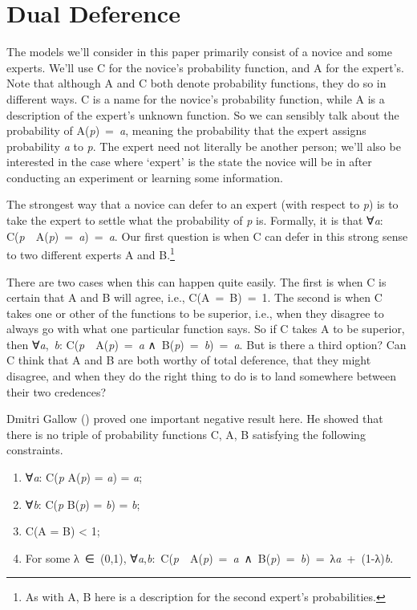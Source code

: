 \documentclass[
  11pt,
  letterpaper,
  DIV=11,
  numbers=noendperiod,
  twoside]{scrartcl}
\providecommand{\tightlist}{%
  \setlength{\itemsep}{0pt}\setlength{\parskip}{0pt}}
\begin{document}
\section{Dual Deference}\label{sec-gallow}

The models we'll consider in this paper primarily consist of a novice
and some experts. We'll use C for the novice's probability function, and
A for the expert's. Note that although A and C both denote probability
functions, they do so in different ways. C is a name for the novice's
probability function, while A is a description of the expert's unknown
function. So we can sensibly talk about the probability of
A(\emph{p})~=~\emph{a}, meaning the probability that the expert assigns
probability \emph{a} to \emph{p}. The expert need not literally be
another person; we'll also be interested in the case where `expert' is
the state the novice will be in after conducting an experiment or
learning some information.

The strongest way that a novice can defer to an expert (with respect to
\emph{p}) is to take the expert to settle what the probability of
\emph{p} is. Formally, it is that ∀\emph{a}:
C(\emph{p}~\textbar~A(\emph{p})~=~\emph{a})~=~\emph{a}. Our first
question is when C can defer in this strong sense to two different
experts A and B.\footnote{As with A, B here is a description for the
  second expert's probabilities.}

There are two cases when this can happen quite easily. The first is when
C is certain that A and B will agree, i.e., C(A~=~B)~=~1. The second is
when C takes one or other of the functions to be superior, i.e., when
they disagree to always go with what one particular function says. So if
C takes A to be superior, then ∀\emph{a},~\emph{b}:
C(\emph{p}~\textbar~A(\emph{p})~=~\emph{a}
∧~B(\emph{p})~=~\emph{b})~=~\emph{a}. But is there a third option? Can C
think that A and B are both worthy of total deference, that they might
disagree, and when they do the right thing to do is to land somewhere
between their two credences?

Dmitri Gallow () proved one important
negative result here. He showed that there is no triple of probability
functions C, A, B satisfying the following constraints.

\begin{enumerate}
\def\labelenumi{\arabic{enumi}.}
\tightlist
\item
  ∀\emph{a}: C(\emph{p} \textbar{} A(\emph{p}) = \emph{a}) = \emph{a};
\item
  ∀\emph{b}: C(\emph{p} \textbar{} B(\emph{p}) = \emph{b}) = \emph{b};
\item
  C(A = B) \textless{} 1;
\item
  For some λ~∈~(0,1),
  ∀\emph{a},\emph{b}:~C(\emph{p}~\textbar~A(\emph{p})~=~\emph{a}~∧~B(\emph{p})~=~\emph{b})~=~λ\emph{a}~+~(1-λ)\emph{b}.
\end{enumerate}
\end{document}
